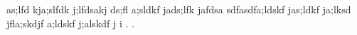 as;lfd kja;slfdk j;lfdsakj ds;fl   a;sldkf
jads;lfk jafdsa sdfasdfa;ldskf jas;ldkf ja;lksd
jfla;skdjf  a;ldskf j;alskdf j i . .
